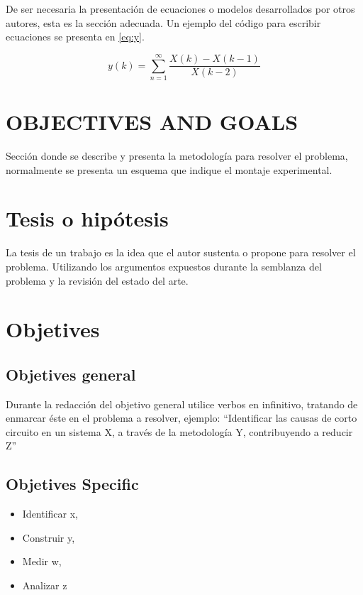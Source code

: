 \documentclass[twocolumns]{IEEEtran}
\begin{document}

De ser necesaria la presentación de ecuaciones o modelos desarrollados por otros autores, esta es la sección adecuada. Un ejemplo del código para escribir ecuaciones se presenta en \eqref{eq:y}.

\begin{equation}
y(k)=\sum_{n=1}^{\infty}\frac{X(k)-X(k-1)}{X(k-2)}\label{eq:y}
\end{equation}

\section{OBJECTIVES AND GOALS}
Sección donde se describe y presenta la metodología para resolver el problema, normalmente se presenta un esquema que indique el montaje experimental.

\section{Tesis o hipótesis}
La tesis de un trabajo es la idea que el autor sustenta o propone para resolver el problema. Utilizando los argumentos expuestos  durante la semblanza del problema y la revisión del estado del arte.


\section{Objetives}
\subsection{Objetives general}
Durante la redacción del objetivo general utilice verbos en infinitivo, tratando de enmarcar éste en el problema a resolver, ejemplo: ``Identificar las causas de corto circuito en un sistema X, 
a través de  la metodología Y, contribuyendo  a reducir Z''

\subsection{Objetives Specific}
\begin{itemize}
\item  Identificar  x, 
\item Construir y,
\item Medir w, 
\item Analizar  z
\end{itemize}
\end{document}
